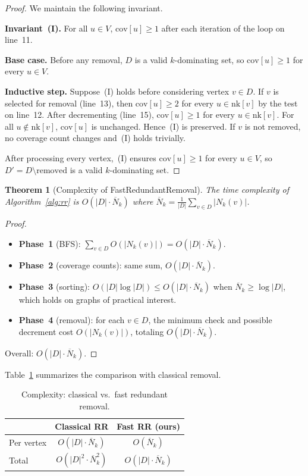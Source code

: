\documentclass[11pt,a4paper]{article}
\newtheorem{theorem}{Theorem}
\newcommand{\Nk}{\overline{N}_k}
\newcommand{\cov}{\mathrm{cov}}
\begin{document}
\begin{proof}
We maintain the following invariant.

\textbf{Invariant~(I).} For all $u\in V$, $\cov[u]\ge 1$ after each
iteration of the loop on line~11.

\textbf{Base case.} Before any removal, $D$ is a valid $k$-dominating
set, so $\cov[u]\ge 1$ for every $u\in V$.

\textbf{Inductive step.} Suppose~(I) holds before considering vertex
$v\in D$. If $v$ is selected for removal (line~13), then
$\cov[u]\ge 2$ for every $u\in\text{nk}[v]$ by the test on line~12.
After decrementing (line~15), $\cov[u]\ge 1$ for every $u\in\text{nk}[v]$.
For all $u\notin\text{nk}[v]$, $\cov[u]$ is unchanged.
Hence~(I) is preserved. If $v$ is not removed, no coverage count
changes and~(I) holds trivially.

After processing every vertex,~(I) ensures $\cov[u]\ge 1$ for every
$u\in V$, so $D'=D\setminus\text{removed}$ is a valid $k$-dominating set.
\end{proof}

\begin{theorem}[Complexity of FastRedundantRemoval]
\label{thm:rr-complexity}
The time complexity of Algorithm~\ref{alg:rr} is $O(|D|\cdot\Nk)$
where $\Nk = \frac{1}{|D|}\sum_{v\in D}|N_k(v)|$.
\end{theorem}

\begin{proof}
\begin{itemize}[nosep]
  \item \textbf{Phase~1} (BFS): $\sum_{v\in D}O(|N_k(v)|)=O(|D|\cdot\Nk)$.
  \item \textbf{Phase~2} (coverage counts): same sum, $O(|D|\cdot\Nk)$.
  \item \textbf{Phase~3} (sorting):
    $O(|D|\log|D|)\le O(|D|\cdot\Nk)$ when $\Nk\ge\log|D|$, which holds
    on graphs of practical interest.
  \item \textbf{Phase~4} (removal): for each $v\in D$, the minimum check
    and possible decrement cost $O(|N_k(v)|)$, totaling $O(|D|\cdot\Nk)$.
\end{itemize}
Overall: $O(|D|\cdot\Nk)$.
\end{proof}

Table~\ref{tab:complexity} summarizes the comparison with classical
removal.

\begin{table}[ht]
\centering
\caption{Complexity: classical vs.\ fast redundant removal.}
\label{tab:complexity}
\begin{tabular}{lcc}
\toprule
& \textbf{Classical RR} & \textbf{Fast RR (ours)}\\
\midrule
Per vertex & $O(|D|\cdot\Nk)$ & $O(\Nk)$\\
Total      & $O(|D|^2\cdot\Nk^2)$ & $O(|D|\cdot\Nk)$\\
\bottomrule
\end{tabular}
\end{table}
\end{document}
